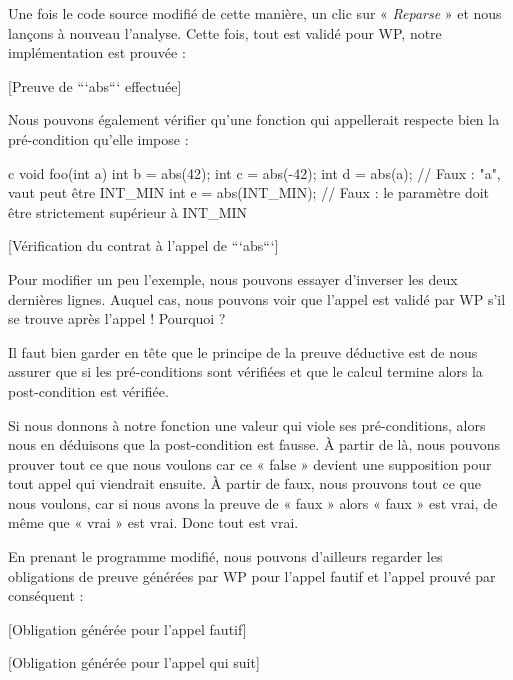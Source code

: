 Une fois le code source modifié de cette manière, un clic sur « \textit{Reparse} » et 
nous lançons à nouveau l'analyse. Cette fois, tout est validé pour WP, notre 
implémentation est prouvée :



[Preuve de ```abs``` effectuée]


Nous pouvons également vérifier qu'une fonction qui appellerait  
respecte bien la pré-condition qu'elle impose :



\begin{CodeBlock}{c}
void foo(int a){
   int b = abs(42);
   int c = abs(-42);
   int d = abs(a);       // Faux : "a", vaut peut être INT_MIN
   int e = abs(INT_MIN); // Faux : le paramètre doit être strictement supérieur à INT_MIN
}
\end{CodeBlock}



[Vérification du contrat à l'appel de ```abs```]


Pour modifier un peu l'exemple, nous pouvons essayer d'inverser les deux 
dernières lignes. Auquel cas, nous pouvons voir que l'appel 
est validé par WP s'il se trouve après l'appel  ! 
Pourquoi ?



Il faut bien garder en tête que le principe de la preuve déductive est de nous
assurer que si les pré-conditions sont vérifiées et que le calcul termine alors
la post-condition est vérifiée.



Si nous donnons à notre fonction une valeur qui viole ses pré-conditions, alors
nous en déduisons que la post-condition est fausse. À partir de là, nous pouvons 
prouver tout ce que nous voulons car ce « false » devient une supposition pour
tout appel qui viendrait ensuite. À partir de faux, nous prouvons tout ce que 
nous voulons, car si nous avons la preuve de « faux » alors « faux » est vrai, de 
même que « vrai » est vrai. Donc tout est vrai.



En prenant le programme modifié, nous pouvons d'ailleurs regarder les obligations
de preuve générées par WP pour l'appel fautif et l'appel prouvé par conséquent :



[Obligation générée pour l'appel fautif]


[Obligation générée pour l'appel qui suit]


